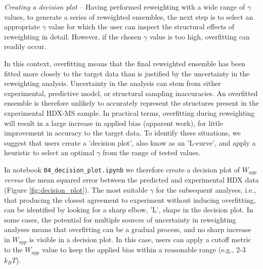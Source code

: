 \documentclass[9pt,tutorial]{livecoms}
\begin{document}
\noindent
\textit{Creating a decision plot} -- Having performed reweighting with a wide range of $\gamma$ values, to generate a series of reweighted ensembles, the next step is to select an appropriate $\gamma$ value for which the user can inspect the structural effects of reweighting in detail.
However, if the chosen $\gamma$ value is too high, overfitting can readily occur. 

In this context, overfitting means that the final reweighted ensemble has been fitted more closely to the target data than is justified by the uncertainty in the reweighting analysis.
Uncertainty in the analysis can stem from either experimental, predictive model, or structural sampling inaccuracies.
An overfitted ensemble is therefore unlikely to accurately represent the structures present in the experimental HDX-MS sample.
In practical terms, overfitting during reweighting will result in a large increase in applied bias (apparent work), for little improvement in accuracy to the target data.
To identify these situations, we suggest that users create a 'decision plot', also know as an 'L-curve', and apply a heuristic to select an optimal $\gamma$ from the range of tested values.

In notebook \texttt{04\_decision\_plot.ipynb} we therefore create a decision plot of $W_{app}$ \textit{versus} the mean squared error between the predicted and experimental HDX data (Figure \ref{fig:decision_plot}).
The most suitable $\gamma$ for the subsequent analyses, i.e., that producing the closest agreement to experiment without inducing overfitting, can be identified by looking for a sharp elbow, 'L', shape in the decision plot.
In some cases, the potential for multiple sources of uncertainty in reweighting analyses means that overfitting can be a gradual process, and no sharp increase in $W_{app}$ is visible in a decision plot.
In this case, users can apply a cutoff metric to the $W_{app}$ value to keep the applied bias within a reasonable range (e.g., 2-3 $k_BT$). 
\end{document}
